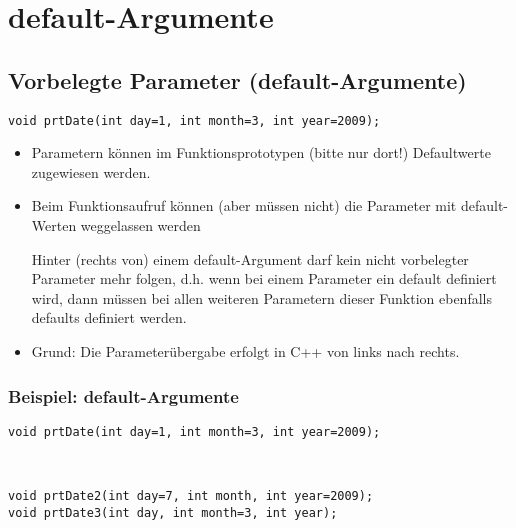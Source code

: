 \section{default-Argumente}

\subsection{Vorbelegte Parameter (default-Argumente)}
\begin{minipage}{0.65\linewidth}
\begin{lstlisting}
void prtDate(int day=1, int month=3, int year=2009);
\end{lstlisting}
\end{minipage}
\normalsize
\begin{itemize}
	\item Parametern können im Funktionsprototypen (\color{red}bitte nur dort!\color{black}) Defaultwerte zugewiesen werden.
	\item Beim Funktionsaufruf können (aber müssen nicht) die Parameter mit default-Werten weggelassen werden\\
	\begin{achtung}Hinter (rechts von) einem default-Argument darf kein nicht vorbelegter Parameter mehr folgen, d.h. wenn bei einem Parameter ein default definiert wird, dann müssen bei allen weiteren Parametern dieser Funktion ebenfalls defaults definiert werden.
	\end{achtung}
	\item Grund: Die Parameterübergabe erfolgt in C++ von links nach rechts.
\end{itemize}

\subsubsection{Beispiel: default-Argumente}
\noindent
\begin{minipage}{\linewidth}
\begin{lstlisting}
void prtDate(int day=1, int month=3, int year=2009);
\end{lstlisting}
\end{minipage}
\\
\begin{minipage}{0.65\linewidth}
\begin{lstlisting}
void prtDate2(int day=7, int month, int year=2009);
void prtDate3(int day, int month=3, int year);
\end{lstlisting}
\end{minipage}

